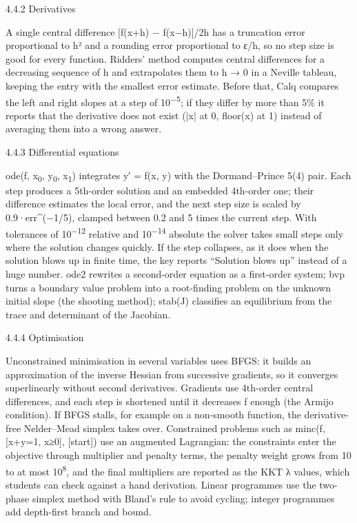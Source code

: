 \documentclass[12pt]{article}
\newcommand{\Hthree}[2]{\par\needspace{4\baselineskip}\vspace{2pt}%
  {\fontsize{14}{17}\selectfont\color{head}#1\par}\nopagebreak}
\begin{document}
\Hthree{4.4.2 Derivatives}{4.4.2 Derivatives}

A single central difference [f(x+h) − f(x−h)]/2h has a truncation error proportional to h² and a rounding error proportional to ε/h, so no step size is good for every function. Ridders’ method computes central differences for a decreasing sequence of h and extrapolates them to h → 0 in a Neville tableau, keeping the entry with the smallest error estimate. Before that, Calq compares the left and right slopes at a step of 10\textsuperscript{−5}; if they differ by more than 5\% it reports that the derivative does not exist (|x| at 0, floor(x) at 1) instead of averaging them into a wrong answer.

\Hthree{4.4.3 Differential equations}{4.4.3 Differential equations}

ode(f, x\textsubscript{0}, y\textsubscript{0}, x\textsubscript{1}) integrates y′ = f(x, y) with the Dormand–Prince 5(4) pair. Each step produces a 5th-order solution and an embedded 4th-order one; their difference estimates the local error, and the next step size is scaled by 0.9·err\textasciicircum{}(−1/5), clamped between 0.2 and 5 times the current step. With tolerances of 10\textsuperscript{−12} relative and 10\textsuperscript{−14} absolute the solver takes small steps only where the solution changes quickly. If the step collapses, as it does when the solution blows up in finite time, the key reports “Solution blows up” instead of a huge number. ode2 rewrites a second-order equation as a first-order system; bvp turns a boundary value problem into a root-finding problem on the unknown initial slope (the shooting method); stab(J) classifies an equilibrium from the trace and determinant of the Jacobian.

\Hthree{4.4.4 Optimisation}{4.4.4 Optimisation}

Unconstrained minimisation in several variables uses BFGS: it builds an approximation of the inverse Hessian from successive gradients, so it converges superlinearly without second derivatives. Gradients use 4th-order central differences, and each step is shortened until it decreases f enough (the Armijo condition). If BFGS stalls, for example on a non-smooth function, the derivative-free Nelder–Mead simplex takes over. Constrained problems such as minc(f, [x+y=1, x≥0], [start]) use an augmented Lagrangian: the constraints enter the objective through multiplier and penalty terms, the penalty weight grows from 10 to at most 10\textsuperscript{8}, and the final multipliers are reported as the KKT λ values, which students can check against a hand derivation. Linear programmes use the two-phase simplex method with Bland’s rule to avoid cycling; integer programmes add depth-first branch and bound.
\end{document}
